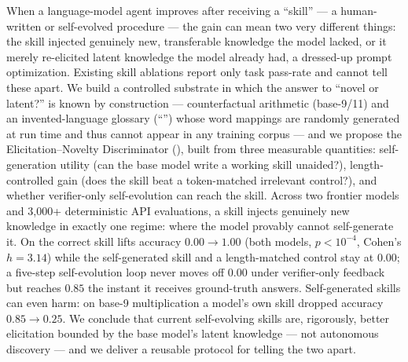 When a language-model agent improves after receiving a ``skill'' --- a human-written
or self-evolved procedure --- the gain can mean two very different things: the skill
injected genuinely new, transferable knowledge the model lacked, or it merely
re-elicited latent knowledge the model already had, a dressed-up prompt optimization.
Existing skill ablations report only task pass-rate and cannot tell these apart.
We build a controlled substrate in which the answer to ``novel or latent?'' is known by
construction --- counterfactual arithmetic (base-9/11) and an invented-language glossary
(``\zeth'') whose word mappings are randomly generated at run time and thus cannot appear
in any training corpus --- and we propose the Elicitation--Novelty Discriminator (\END),
built from three measurable quantities: self-generation utility (can the base model write a
working skill unaided?), length-controlled gain (does the skill beat a token-matched
irrelevant control?), and whether verifier-only self-evolution can reach the skill.
Across two frontier models and 3{,}000+ deterministic API evaluations, a skill injects
genuinely new knowledge in exactly one regime: where the model provably cannot self-generate
it. On \zeth the correct skill lifts accuracy $0.00 \to 1.00$ (both models, $p<10^{-4}$,
Cohen's $h=3.14$) while the self-generated skill and a length-matched control stay at $0.00$;
a five-step self-evolution loop never moves \zeth off $0.00$ under verifier-only feedback but
reaches $0.85$ the instant it receives ground-truth answers. Self-generated skills can even
harm: on base-9 multiplication a model's own skill dropped accuracy $0.85 \to 0.25$. We conclude
that current self-evolving skills are, rigorously, better elicitation bounded by the base
model's latent knowledge --- not autonomous discovery --- and we deliver a reusable protocol
for telling the two apart.
